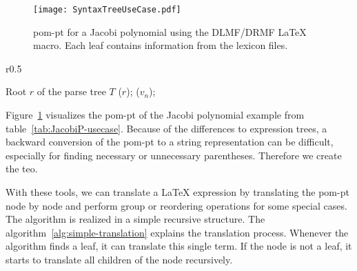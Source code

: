 \begin{figure}[ht]
	\centering
	\texttt{[image: SyntaxTreeUseCase.pdf]}
	\caption{pom-pt for a Jacobi polynomial using the DLMF/DRMF \LaTeX{} macro. Each leaf contains information from the lexicon files.}
	\label{fig:syntax-tree-usecase}
	\vspace{-10pt}
\end{figure}

\begin{wrapfigure}{r}{0.5\textwidth}
\vspace{-20pt}
\begin{minipage}{0.5\textwidth}
\begin{algorithm}[H]
\caption{Simple translation algorithm for the POM-Parse Tree}\label{alg:simple-translation}
	\begin{algorithmic}[1]
	\Require Root $r$ of the parse tree $T$
		($r$);
	\Else
			($v_n$);
		\EndFor
	\EndIf
	\EndProcedure
	\end{algorithmic}
\end{algorithm}
\end{minipage}
\vspace{-14pt}
\end{wrapfigure}

Figure~\ref{fig:syntax-tree-usecase} visualizes the \gls*{pom-pt} of the Jacobi polynomial example from table~\ref{tab:JacobiP-usecase}. Because of the differences to expression trees, a backward conversion of the \gls*{pom-pt} to a string representation can be difficult, especially for finding necessary or unnecessary parentheses. Therefore we create the \gls*{teo}.

With these tools, we can translate a \LaTeX{} expression by translating the \gls*{pom-pt} node by node and perform group or reordering operations for some special cases. The algorithm is realized in a simple recursive structure. The algorithm~\ref{alg:simple-translation} explains the translation process. Whenever the algorithm finds a leaf, it can translate this single term. If the node is not a leaf, it starts to translate all children of the node recursively. 

